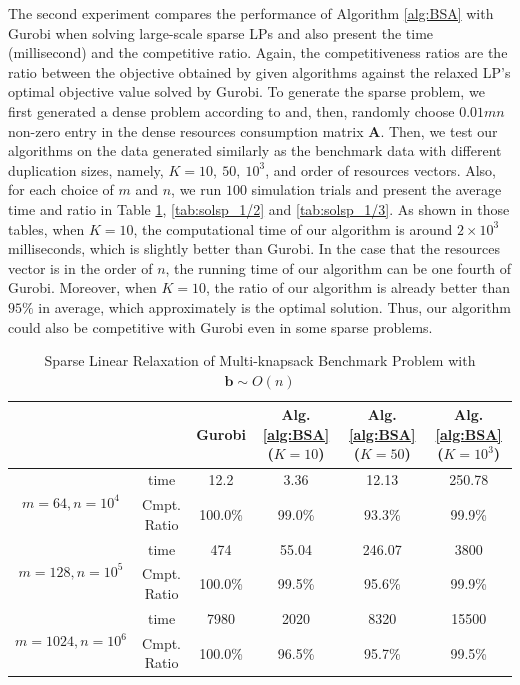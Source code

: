 \documentclass{article} %
\begin{document}
The second experiment compares the performance of Algorithm \ref{alg:BSA} with Gurobi when solving large-scale sparse LPs and also present the time (millisecond) and the competitive ratio. Again, the competitiveness ratios are the ratio between the objective obtained by given algorithms against the relaxed LP's optimal objective value solved by Gurobi. To generate the sparse problem, we first generated a dense problem according to \cite{chu1998genetic} and, then, randomly choose $0.01mn$ non-zero entry in the dense resources consumption matrix $\bm{A}$. Then, we test our algorithms on the data generated similarly as the benchmark data with different duplication sizes, namely, $K=10,\ 50,\ 10^3$, and order of resources vectors. Also, for each choice of $m$ and $n$, we run $100$ simulation trials and present the average time and ratio in Table \ref{tab:solsp_1}, \ref{tab:solsp_1/2} and \ref{tab:solsp_1/3}. As shown in those tables, when $K=10$, the computational time of our algorithm is around $2\times 10^3$ milliseconds, which is slightly better than Gurobi. In the case that the resources vector is in the order of $n$, the running time of our algorithm can be one fourth of Gurobi. Moreover, when $K=10$, the ratio of our algorithm is already better than $95\%$ in average, which approximately is the optimal solution. Thus, our algorithm could also be competitive with Gurobi even in some sparse problems.



\begin{table}[ht!]
    \centering
    \small
    \begin{tabular}{cc|c|c|c|c}
    \toprule
         && Gurobi  & Alg. \ref{alg:BSA} ($K=10$) & Alg. \ref{alg:BSA} ($K=50$) & Alg. \ref{alg:BSA}  ($K=10^3$) \\
         \midrule
   \multirow{2}{*}{\scriptsize $m=64, n=10^4$}  & time & 12.2 & 3.36 & 12.13 & 250.78 \\
   & Cmpt. Ratio &100.0\%  & 99.0\% & 93.3\% & 99.9\%  \\
\midrule
  \multirow{2}{*}{\scriptsize $m=128, n=10^5$} &  time  & 474 & 55.04 &  246.07  & 3800  \\ 
   &Cmpt. Ratio & 100.0\% & 99.5\% & 95.6\% & 99.9\%   \\
\midrule
    \multirow{2}{*}{\scriptsize $m=1024, n=10^6$} &  time   &  7980  & 2020 & 8320 & 15500  \\ 
  & Cmpt. Ratio & 100.0\% &  96.5\% & 95.7\% & 99.5\% \\
   \bottomrule
    \end{tabular}
        \caption{Sparse Linear Relaxation of Multi-knapsack Benchmark Problem with $\bm{b}\sim O(n)$}
    \label{tab:solsp_1}
\end{table}
\end{document}

